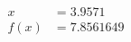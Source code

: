 \documentclass[preview]{standalone}
\begin{document}
\begin{align*}
x &= 3.9571\\f(x) &= 7.8561649
\end{align*}
\end{document}
